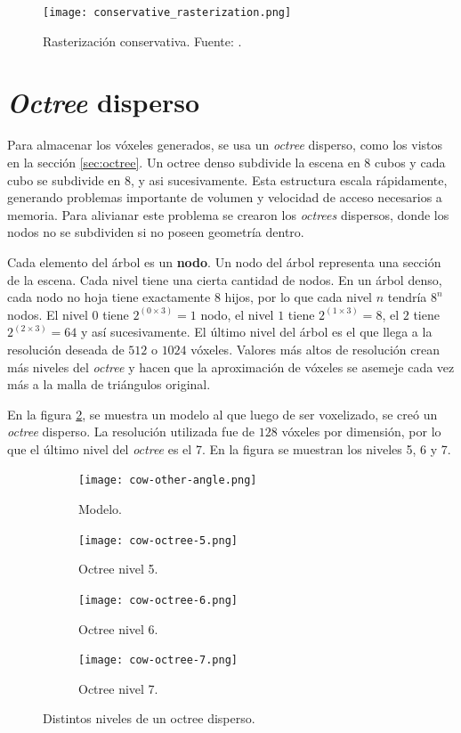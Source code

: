 \begin{figure}[h!]
    \centering
    \texttt{[image: conservative\_rasterization.png]}
    \caption{Rasterización conservativa. Fuente: \cite{opengl-insights}.}
    \label{fig:conservative_rasterization}
\end{figure}

\section{\textit{Octree} disperso}

Para almacenar los vóxeles generados, se usa un \textit{octree} disperso, como los vistos en la sección \ref{sec:octree}.
Un octree denso subdivide la escena en 8 cubos y cada cubo se subdivide en 8, y asi sucesivamente. Esta estructura escala rápidamente, generando problemas importante de volumen y velocidad de acceso necesarios a memoria.
Para alivianar este problema se crearon los \textit{octrees} dispersos, donde los nodos no se subdividen si no poseen geometría dentro.

Cada elemento del árbol es un \textbf{nodo}.
Un nodo del árbol representa una sección de la escena.
Cada nivel tiene una cierta cantidad de nodos.
En un árbol denso, cada nodo no hoja tiene exactamente 8 hijos, por lo que cada nivel $n$ tendría $8^n$ nodos.
El nivel $0$ tiene $2^{(0\times 3)} = 1$ nodo, el nivel $1$ tiene $2^{(1\times 3)} = 8$, el $2$ tiene $2^{(2\times 3)} = 64$ y así sucesivamente. %
El último nivel del árbol es el que llega a la resolución deseada de $512$ o $1024$ vóxeles.
Valores más altos de resolución crean más niveles del \textit{octree} y hacen que la aproximación de vóxeles se asemeje cada vez más a la malla de triángulos original.

En la figura \ref{fig:octree-levels}, se muestra un modelo al que luego de ser voxelizado, se creó un \textit{octree} disperso.
La resolución utilizada fue de $128$ vóxeles por dimensión, por lo que el último nivel del \textit{octree} es el 7.
En la figura se muestran los niveles 5, 6 y 7.

\begin{figure}[ht]
    \begin{subfigure}{.24\textwidth}
        \centering
        \texttt{[image: cow-other-angle.png]}
        \caption{Modelo.}
    \end{subfigure}
    \begin{subfigure}{.24\textwidth}
        \centering
        \texttt{[image: cow-octree-5.png]}
        \caption{Octree nivel 5.}
    \end{subfigure}
    \begin{subfigure}{.24\textwidth}
        \centering
        \texttt{[image: cow-octree-6.png]}
        \caption{Octree nivel 6.}
    \end{subfigure}
    \begin{subfigure}{.24\textwidth}
        \centering
        \texttt{[image: cow-octree-7.png]}
        \caption{Octree nivel 7.}
    \end{subfigure}
    \caption{Distintos niveles de un octree disperso.}
    \label{fig:octree-levels}
\end{figure}

